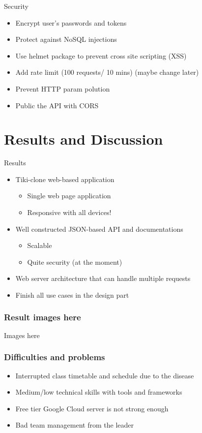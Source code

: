 \documentclass{beamer}
\begin{document}
\begin{frame}[fragile]{Security}
\begin{itemize}
	\item	Encrypt user's passwords and tokens
	\item	Protect against NoSQL injections
	\item	Use helmet package to prevent cross site scripting (XSS)
	\item	Add rate limit (100 requests/ 10 mins) (maybe change later)
	\item	Prevent HTTP param polution
	\item	Public the API with CORS
	\end{itemize}
\end{frame}

\section{Results and Discussion}

\begin{frame}{Results}
	\begin{itemize}
    	\item Tiki-clone web-based application
    	\begin{itemize}
    	    \item Single web page application
    	    \item Responsive with all devices!
    	\end{itemize}
    	\item Well constructed JSON-based API and documentations
    	\begin{itemize}
    	    \item Scalable
    	    \item Quite security (at the moment)
    	\end{itemize}
        \item Web server architecture that can handle multiple requests
        \item Finish all use cases in the design part
	\end{itemize}
\end{frame}

\begin{frame}[fragile]
\frametitle{Result images here}
    Images here
\end{frame} 
    
\begin{frame}[fragile]
\frametitle{Difficulties and problems}
    \begin{itemize}
    	\item Interrupted class timetable and schedule due to the disease
    	\item Medium/low technical skills with tools and frameworks
        \item Free tier Google Cloud server is not strong enough
        \item Bad team management from the leader
	\end{itemize}
\end{frame}    
\end{document}
